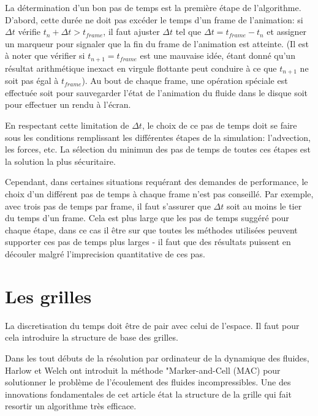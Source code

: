 \documentclass[11pt]{report}
\begin{document}
La détermination d'un bon pas de temps est la première étape de l'algorithme. D'abord, cette durée ne doit pas excéder le temps d'un frame de l'animation: si $ \Delta t $ vérifie $t_n + \Delta t > t_{frame}$, il faut ajuster $ \Delta t$ tel que $ \Delta t = t_{frame} - t_n $ et assigner un marqueur pour signaler que la fin du frame de l'animation est atteinte. (Il est à noter que vérifier si $ t_{n+1} = t_{frame} $ est une mauvaise idée, étant donné qu'un résultat arithmétique inexact en virgule flottante peut conduire à ce que $ t_{n+1} $ ne soit pas égal à $ t_{frame} $). Au bout de chaque frame, une opération spéciale est effectuée soit pour sauvegarder l'état de l'animation du fluide dans le disque soit pour effectuer un rendu à l'écran.\newline

En respectant cette limitation de $\Delta t$, le choix de ce pas de temps doit se faire sous les conditions remplissant les différentes étapes de la simulation: l'advection, les forces, etc. La sélection du minimun des pas de temps de toutes ces étapes est la solution la plus sécuritaire.\newline

Cependant, dans certaines situations requérant des demandes de performance, le choix d'un différent pas de temps à chaque frame n'est pas conseillé. Par exemple, avec trois pas de temps par frame, il faut s'assurer que  $ \Delta t $ soit au moins le tier du temps d'un frame. Cela est plus large que les pas de temps suggéré pour chaque étape, dans ce cas il être sur que toutes les méthodes utilisées peuvent supporter ces pas de temps plus larges - il faut que des résultats puissent en découler malgré l'imprecision quantitative de ces pas. 

\section{Les grilles}

La discretisation du temps doit être de pair avec celui de l'espace.
Il faut pour cela introduire la structure de base des grilles.\newline

Dans les tout débuts de la résolution par ordinateur de la dynamique des fluides, Harlow et Welch \cite{harlow-65} ont introduit la méthode "Marker-and-Cell (MAC) pour solutionner le problème de l'écoulement des fluides incompressibles. Une des innovations fondamentales de cet article état la structure de la grille qui fait resortir un algorithme très efficace.\newline
\end{document}
